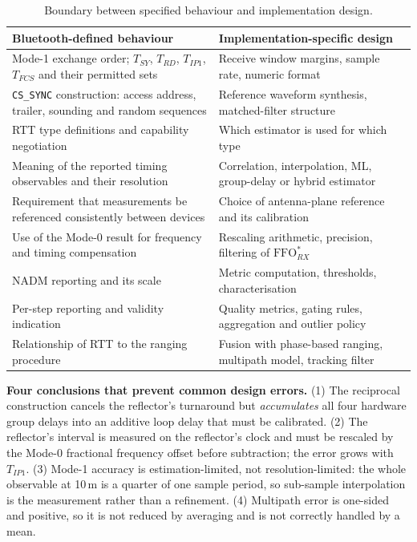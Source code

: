 \documentclass[11pt,a4paper]{article}
\newcommand{\FFO}{\mathrm{FFO}}
\newcommand{\NADM}{\mathrm{NADM}}
\newcommand{\Tsy}{T_{SY}}
\newcommand{\Trd}{T_{RD}}
\newcommand{\Tip}{T_{IP1}}
\newcommand{\code}[1]{\texttt{\small #1}}
\begin{document}
\begin{table}[htb]
\caption{Boundary between specified behaviour and implementation design.}
\label{tab:normvsimpl}
\centering\small
\begin{tabular}{@{}L{62mm}L{62mm}@{}}
\toprule
Bluetooth-defined behaviour & Implementation-specific design \\
\midrule
Mode-1 exchange order; $\Tsy$, $\Trd$, $\Tip$, $T_{FCS}$ and their permitted sets & Receive window margins, sample rate, numeric format \\
\code{CS\_SYNC} construction: access address, trailer, sounding and random sequences & Reference waveform synthesis, matched-filter structure \\
RTT type definitions and capability negotiation & Which estimator is used for which type \\
Meaning of the reported timing observables and their resolution & Correlation, interpolation, ML, group-delay or hybrid estimator \\
Requirement that measurements be referenced consistently between devices & Choice of antenna-plane reference and its calibration \\
Use of the Mode-0 result for frequency and timing compensation & Rescaling arithmetic, precision, filtering of $\FFO^{*}_{RX}$ \\
$\NADM$ reporting and its scale & Metric computation, thresholds, characterisation \\
Per-step reporting and validity indication & Quality metrics, gating rules, aggregation and outlier policy \\
Relationship of RTT to the ranging procedure & Fusion with phase-based ranging, multipath model, tracking filter \\
\bottomrule
\end{tabular}
\end{table}

\begin{callout}
\textbf{Four conclusions that prevent common design errors.} (1) The reciprocal construction cancels
the reflector's turnaround but \emph{accumulates} all four hardware group delays into an additive
loop delay that must be calibrated. (2) The reflector's interval is measured on the reflector's
clock and must be rescaled by the Mode-0 fractional frequency offset before subtraction; the error
grows with $\Tip$. (3) Mode-1 accuracy is estimation-limited, not resolution-limited: the whole
observable at 10\,m is a quarter of one sample period, so sub-sample interpolation is the
measurement rather than a refinement. (4) Multipath error is one-sided and positive, so it is not
reduced by averaging and is not correctly handled by a mean.
\end{callout}
\end{document}
